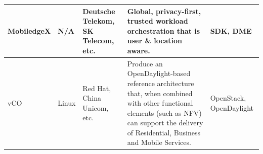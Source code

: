 \begin{table}
\begin{turn}{90}
\begin{tabular}{ | p{2cm} | p{2cm} | p{2.5cm} | p{8cm} | p{2.5cm} | }
    MobiledgeX & N/A & Deutsche Telekom, SK Telecom, etc. & Global, privacy-first, trusted workload orchestration that is user \& location aware. & SDK, DME \\ \hline

    vCO & Linux & Red Hat, China Unicom, etc. &  Produce an OpenDaylight-based reference architecture that, when combined with other
    functional elements (such as NFV) can support the delivery of Residential, Business and Mobile Services. & OpenStack, OpenDaylight \\ \hline
    \end{tabular}

\end{turn}

\end{table}
